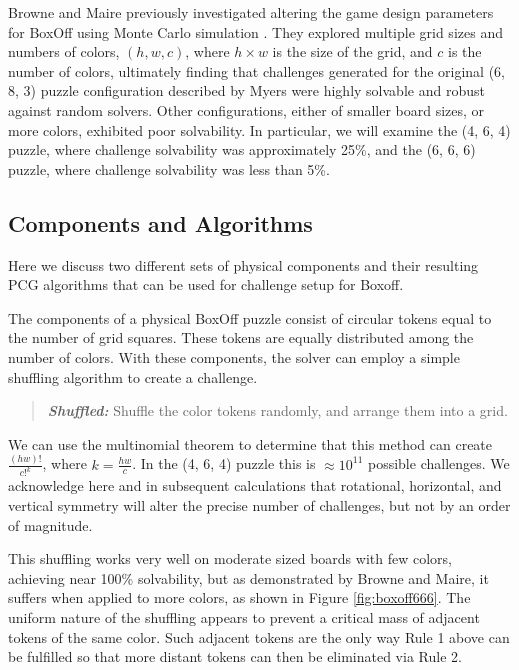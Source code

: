 \documentclass[journal]{IEEEtran}
\begin{document}
Browne and Maire previously investigated altering the game design parameters for BoxOff using Monte Carlo simulation \cite{MCPUZZLE}. They explored multiple grid sizes and numbers of colors, $(h, w, c)$, where $h \times w$ is the size of the grid, and $c$ is the number of colors, ultimately finding that challenges generated for the original (6, 8, 3) puzzle configuration described by Myers were highly solvable and robust against random solvers. Other configurations, either of smaller board sizes, or more colors, exhibited poor solvability. In particular, we will examine the (4, 6, 4) puzzle, where challenge solvability was approximately 25\%, and the (6, 6, 6) puzzle, where challenge solvability was less than 5\%.


\subsection{Components and Algorithms}
\noindent
Here we discuss two different sets of physical components and their resulting PCG algorithms that can be used for challenge setup for Boxoff. 

The components of a physical BoxOff puzzle consist of circular tokens equal to the number of grid squares. These tokens are equally distributed among the number of colors. 
With these components, the solver can employ a simple shuffling algorithm to create a challenge.
\begin{quote}
    {\it \bf Shuffled:} Shuffle the color tokens randomly, and arrange them into a grid.
\end{quote}

We can use the multinomial theorem to determine that this method can create
$\frac{(hw)!}{c!^{k}}$, where $k=\frac{hw}{c}$. In the (4, 6, 4) puzzle this is $\approx 10^{11}$ possible challenges.  We acknowledge here and in subsequent calculations that rotational, horizontal, and vertical symmetry will alter the precise number of challenges, but not by an order of magnitude.

This shuffling works very well on moderate sized boards with few colors, achieving near 100\% solvability, but as demonstrated by Browne and Maire, it suffers when applied to more colors, as shown in Figure \ref{fig:boxoff666}. The uniform nature of the shuffling appears to prevent a critical mass of adjacent tokens of the same color. Such adjacent tokens are the only way Rule 1 above can be fulfilled so that more distant tokens can then be eliminated via Rule 2.
\end{document}
